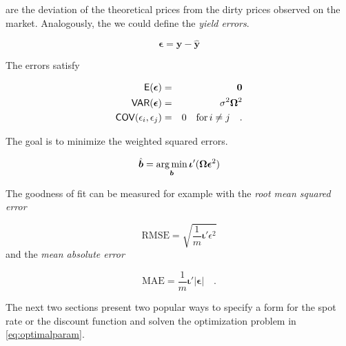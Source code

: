 are the deviation of the theoretical prices from the dirty prices observed on the market. Analogously, the we could define the \emph{yield errors}.


\begin{equation}
  \label{eq:yielderrors}
  \bm{\epsilon} = \bm{y-\hat{y}}
\end{equation}


The errors satisfy

\begin{eqnarray*}
  \label{eq:residuals}
  \mathsf{E}(\bm{\epsilon}) &=& \bm{0}\\
  \mathsf{VAR}(\bm{\epsilon}) &=&\sigma^2\bm{\Omega}^2 \\
  \mathsf{COV}(\epsilon_i, \epsilon_j) &=& 0 \quad \mbox{for}\,i\neq j\quad .
\end{eqnarray*}

The goal is to minimize the weighted squared errors.


\begin{equation}
  \label{eq:optimalparam}
  \hat{\bm{b}}= \operatorname*{arg\,min}_{\bm{b}}\bm{\iota}'(\bm{\Omega}\bm{\epsilon}^2)
\end{equation}

The goodness of fit can be measured for example with the \emph{root mean squared error}

\begin{equation}
  \label{eq:rmse}
  \mbox{RMSE}=\sqrt{\frac{1}{m}\bm{\iota}'\epsilon^2}
\end{equation}
and the \emph{mean absolute error}

\begin{equation}
  \label{eq:mae}
  \mbox{MAE}=\frac{1}{m}\bm{\iota}'|\bm{\epsilon}|\quad.
\end{equation}

The next two sections present two popular ways to specify a form for the spot rate or the discount function and solven the optimization problem in \eqref{eq:optimalparam}.


